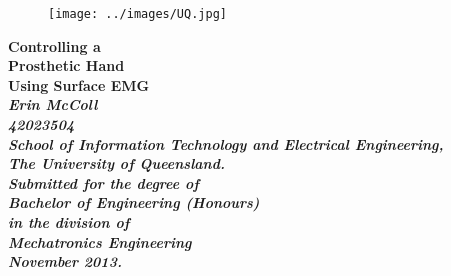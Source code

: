 \documentclass[12pt,openany,a4paper]{book}
\renewcommand{\baselinestretch}{1.2}	%
\begin{document}
\frontmatter

\begin{titlepage}
\renewcommand{\baselinestretch}{1.0}
\begin{figure}[h]
\centering
\texttt{[image: ../images/UQ.jpg]}
\end{figure}
\begin{center}
\vspace*{35mm}
\Huge\bf
		Controlling a  \\
		Prosthetic Hand \\
		Using Surface EMG\\
\vspace{20mm}
\large\sl
		Erin McColl\\
		42023504
		\bigskip\\
\rm
		School of Information Technology and Electrical Engineering,\\
		The University of Queensland.\\
\vspace{30mm}
		Submitted for the degree of\\
		Bachelor of Engineering (Honours)
		\smallskip\\
\normalsize
		in the division of\\
		Mechatronics Engineering
		\medskip\\
\large
		November 2013.		
\end{center}
\end{titlepage}

\pagestyle{fancy}
\fancyfoot{}
\fancyhead{}
\renewcommand{\headrulewidth}{0pt}
\fancyfoot[C] {\footnotesize \thepage}

\cleardoublepage
\end{document}
